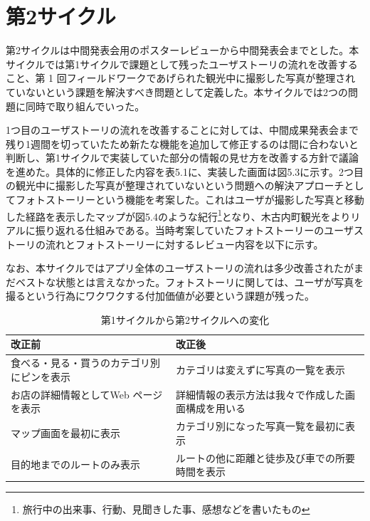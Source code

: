 \section{第2サイクル}
第2サイクルは中間発表会用のポスターレビューから中間発表会までとした。本サイクルでは第1サイクルで課題として残ったユーザストーリの流れを改善すること、第 1 回フィールドワークであげられた観光中に撮影した写真が整理されていないという課題を解決すべき問題として定義した。本サイクルでは2つの問題に同時で取り組んでいった。
\par 1つ目のユーザストーリの流れを改善することに対しては、中間成果発表会まで残り1週間を切っていたため新たな機能を追加して修正するのは間に合わないと判断し、第1サイクルで実装していた部分の情報の見せ方を改善する方針で議論を進めた。具体的に修正した内容を表5.1に、実装した画面は図5.3に示す。2つ目の観光中に撮影した写真が整理されていないという問題への解決アプローチとしてフォトストーリーという機能を考案した。これはユーザが撮影した写真と移動した経路を表示したマップが図5.4のような紀行\footnote{旅行中の出来事、行動、見聞きした事、感想などを書いたもの}となり、木古内町観光をよりリアルに振り返れる仕組みである。当時考案していたフォトストーリーのユーザストーリの流れとフォトストーリーに対するレビュー内容を以下に示す。
\par なお、本サイクルではアプリ全体のユーザストーリの流れは多少改善されたがまだベストな状態とは言えなかった。フォトストーリに関しては、ユーザが写真を撮るという行為にワクワクする付加価値が必要という課題が残った。

\begin{table}[htb]
\centering
\addtocounter{table}{+0}
\caption{第1サイクルから第2サイクルへの変化}
  \begin{tabular}{|l|l|} \hline
    改正前&改正後  \\ \hline 
    食べる・見る・買うのカテゴリ別にピンを表示 & \parbox{20zw}{カテゴリは変えずに写真の一覧を表示} \\  \hline
    お店の詳細情報としてWeb ページを表示 &\parbox{20zw}{詳細情報の表示方法は我々で作成した画面構成を用いる}\\ \hline
    マップ画面を最初に表示 & \parbox{20zw}{カテゴリ別になった写真一覧を最初に表示}\\ \hline
    目的地までのルートのみ表示 & \parbox{20zw}{ルートの他に距離と徒歩及び車での所要時間を表示} \\ \hline
  \end{tabular} 
\end{table}

